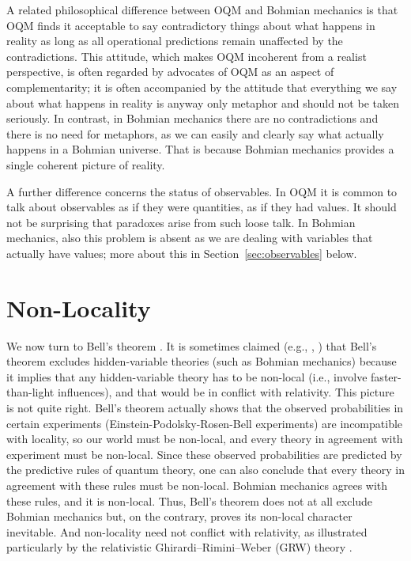 \documentclass[12pt]{article}
\begin{document}
A related philosophical difference between OQM and Bohmian mechanics is that OQM finds it acceptable to say contradictory things about what happens in reality as long as all operational predictions remain unaffected by the contradictions. This attitude, which makes OQM incoherent from a realist perspective, is often regarded by advocates of OQM as an aspect of complementarity; it is often accompanied by the attitude that everything we say about what happens in reality is anyway only metaphor and should not be taken seriously. In contrast, in Bohmian mechanics there are no contradictions and there is no need for metaphors, as we can easily and clearly say what actually happens in a Bohmian universe. That is because Bohmian mechanics provides a single coherent picture of reality.

A further difference concerns the status of observables. In OQM it is common to talk about observables as if they were quantities, as if they had values. It should not be surprising that paradoxes arise from such loose talk. In Bohmian mechanics, also this problem is absent as we are dealing with variables that actually have values; more about this in Section~\ref{sec:observables} below.



\section{Non-Locality}
\label{sec:nonlocality}

We now turn to Bell's theorem \cite{Bell64,GNTZ,Bell87b,Mau0}. It is sometimes claimed (e.g., \cite[p.~53]{Wig}, \cite{Hawking}) that Bell's theorem excludes hidden-variable theories (such as Bohmian mechanics) because it implies that any hidden-variable theory has to be non-local (i.e., involve faster-than-light influences), and that would be in conflict with relativity. This picture is not quite right. Bell's theorem actually shows that the observed probabilities in certain experiments (Einstein-Podolsky-Rosen-Bell experiments) are incompatible with locality, so our world must be non-local, and every theory in agreement with experiment must be non-local. Since these observed probabilities are predicted by the predictive rules of quantum theory, one can also conclude that every theory in agreement with these rules must be non-local. Bohmian mechanics agrees with these rules, and it is non-local. Thus, Bell's theorem does not at all exclude Bohmian mechanics but, on the contrary, proves its non-local character inevitable. And non-locality need not conflict with relativity, as illustrated particularly by the relativistic Ghirardi--Rimini--Weber (GRW) theory \cite{Tum06,Mau0}.
\end{document}
